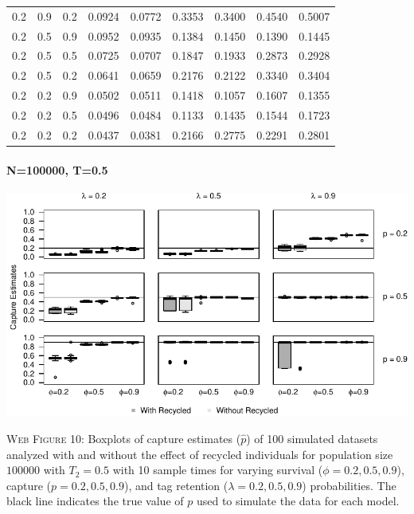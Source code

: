 \documentclass[]{article}
\let\oldparagraph\paragraph
\renewcommand{\paragraph}[1]{\oldparagraph{#1}\mbox{}}
\begin{document}
\begin{table}[ht]
{\begin{tabular}{rrrrrrrrr}
  0.2 & 0.9 & 0.2 & 0.0924 & 0.0772 & 0.3353 & 0.3400 & 0.4540 & 0.5007 \\ 
  0.2 & 0.5 & 0.9 & 0.0952 & 0.0935 & 0.1384 & 0.1450 & 0.1390 & 0.1445 \\ 
  0.2 & 0.5 & 0.5 & 0.0725 & 0.0707 & 0.1847 & 0.1933 & 0.2873 & 0.2928 \\ 
  0.2 & 0.5 & 0.2 & 0.0641 & 0.0659 & 0.2176 & 0.2122 & 0.3340 & 0.3404 \\ 
  0.2 & 0.2 & 0.9 & 0.0502 & 0.0511 & 0.1418 & 0.1057 & 0.1607 & 0.1355 \\ 
  0.2 & 0.2 & 0.5 & 0.0496 & 0.0484 & 0.1133 & 0.1435 & 0.1544 & 0.1723 \\ 
  0.2 & 0.2 & 0.2 & 0.0437 & 0.0381 & 0.2166 & 0.2775 & 0.2291 & 0.2801 \\ 
   \hline
\end{tabular}
}
\endgroup
\end{table}

\newpage

\paragraph{N=100000, T=0.5}\label{n100000-t0.5-1}

\includegraphics{Appendix_BW_files/figure-latex/figure10_capture_GJSTL3-1.pdf}

\textsc{Web Figure 10:} Boxplots of capture estimates (\(\hat{p}\)) of
100 simulated datasets analyzed with and without the effect of recycled
individuals for population size \(100000\) with \(T_2=0.5\) with 10 sample times for varying survival (\(\phi=0.2,0.5,0.9\)), capture
(\(p=0.2,0.5,0.9\)), and tag retention (\(\lambda=0.2,0.5,0.9\))
probabilities. The black line indicates the true value of \(p\) used to
simulate the data for each model.
\end{document}
